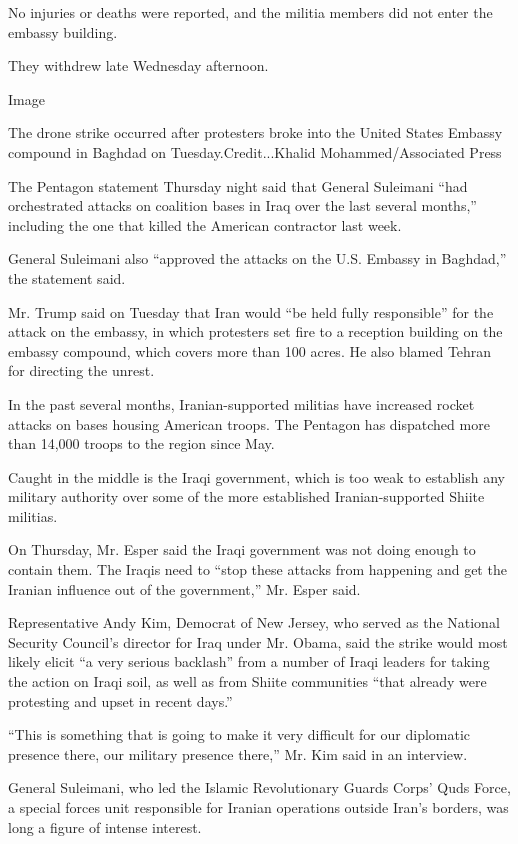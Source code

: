 No injuries or deaths were reported, and the militia members did not
enter the embassy building.

They withdrew late Wednesday afternoon.

Image

The drone strike occurred after protesters broke into the United States
Embassy compound in Baghdad on Tuesday.Credit...Khalid
Mohammed/Associated Press

The Pentagon statement Thursday night said that General Suleimani ``had
orchestrated attacks on coalition bases in Iraq over the last several
months,'' including the one that killed the American contractor last
week.

General Suleimani also ``approved the attacks on the U.S. Embassy in
Baghdad,'' the statement said.

Mr. Trump said on Tuesday that Iran would ``be held fully responsible''
for the attack on the embassy, in which protesters set fire to a
reception building on the embassy compound, which covers more than 100
acres. He also blamed Tehran for directing the unrest.

In the past several months, Iranian-supported militias have increased
rocket attacks on bases housing American troops. The Pentagon has
dispatched more than 14,000 troops to the region since May.

Caught in the middle is the Iraqi government, which is too weak to
establish any military authority over some of the more established
Iranian-supported Shiite militias.

On Thursday, Mr. Esper said the Iraqi government was not doing enough to
contain them. The Iraqis need to ``stop these attacks from happening and
get the Iranian influence out of the government,'' Mr. Esper said.

Representative Andy Kim, Democrat of New Jersey, who served as the
National Security Council's director for Iraq under Mr. Obama, said the
strike would most likely elicit ``a very serious backlash'' from a
number of Iraqi leaders for taking the action on Iraqi soil, as well as
from Shiite communities ``that already were protesting and upset in
recent days.''

``This is something that is going to make it very difficult for our
diplomatic presence there, our military presence there,'' Mr. Kim said
in an interview.

General Suleimani, who led the Islamic Revolutionary Guards Corps' Quds
Force, a special forces unit responsible for Iranian operations outside
Iran's borders, was long a figure of intense interest.

